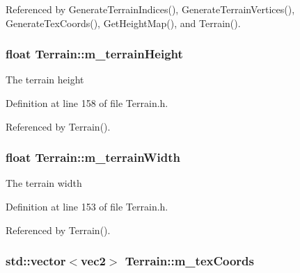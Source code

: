Referenced by Generate\+Terrain\+Indices(), Generate\+Terrain\+Vertices(), Generate\+Tex\+Coords(), Get\+Height\+Map(), and Terrain().

\subsubsection[{\texorpdfstring{m\+\_\+terrain\+Height}{m_terrainHeight}}]{\setlength{\rightskip}{0pt plus 5cm}float Terrain\+::m\+\_\+terrain\+Height\hspace{0.3cm}{\ttfamily [private]}}\hypertarget{class_terrain_a58e7994c6f769990ba00bc63d94ab286}{}\label{class_terrain_a58e7994c6f769990ba00bc63d94ab286}


The terrain height 



Definition at line 158 of file Terrain.\+h.



Referenced by Terrain().

\subsubsection[{\texorpdfstring{m\+\_\+terrain\+Width}{m_terrainWidth}}]{\setlength{\rightskip}{0pt plus 5cm}float Terrain\+::m\+\_\+terrain\+Width\hspace{0.3cm}{\ttfamily [private]}}\hypertarget{class_terrain_ab9424986c9808f8e90d0df6c531ebbf8}{}\label{class_terrain_ab9424986c9808f8e90d0df6c531ebbf8}


The terrain width 



Definition at line 153 of file Terrain.\+h.



Referenced by Terrain().

\subsubsection[{\texorpdfstring{m\+\_\+tex\+Coords}{m_texCoords}}]{\setlength{\rightskip}{0pt plus 5cm}std\+::vector$<${\bf vec2}$>$ Terrain\+::m\+\_\+tex\+Coords\hspace{0.3cm}{\ttfamily [private]}}\hypertarget{class_terrain_a5b85196bac6771bddd1b99ac51952626}{}\label{class_terrain_a5b85196bac6771bddd1b99ac51952626}


